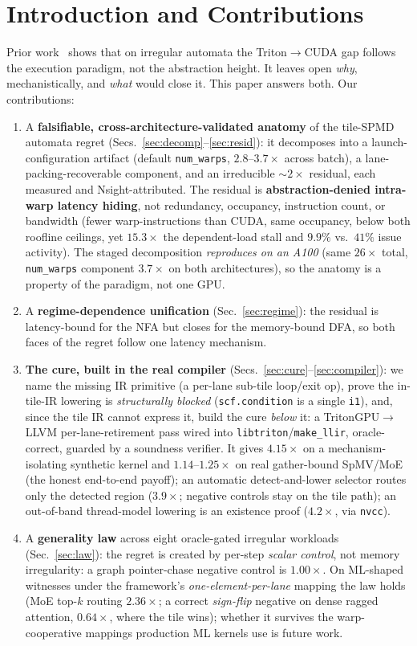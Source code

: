 \documentclass[manuscript,review,anonymous]{acmart}
\begin{document}
\section{Introduction and Contributions}
Prior work~\cite{paper1} shows that on irregular automata the Triton$\rightarrow$CUDA gap
follows the execution paradigm, not the abstraction height. It leaves open \emph{why}, mechanistically,
and \emph{what} would close it. This paper answers both. Our contributions:
\begin{enumerate}
\item A \textbf{falsifiable, cross-architecture-validated anatomy} of the tile-SPMD automata regret
(Secs.~\ref{sec:decomp}--\ref{sec:resid}): it decomposes into a launch-configuration artifact
(default \texttt{num\_warps}, $2.8$--$3.7\times$ across batch), a lane-packing-recoverable component,
and an irreducible ${\sim}2\times$ residual, each measured and Nsight-attributed. The residual is
\textbf{abstraction-denied intra-warp latency hiding}, not redundancy, occupancy, instruction count,
or bandwidth (fewer warp-instructions than CUDA, same occupancy, below both roofline ceilings, yet
$15.3\times$ the dependent-load stall and $9.9\%$ vs.\ $41\%$ issue activity). The staged decomposition
\emph{reproduces on an A100} (same $26\times$ total, \texttt{num\_warps} component $3.7\times$ on both
architectures), so the anatomy is a property of the paradigm, not one GPU.
\item A \textbf{regime-dependence unification} (Sec.~\ref{sec:regime}): the residual is latency-bound
for the NFA but closes for the memory-bound DFA, so both faces of the regret follow one latency mechanism.
\item \textbf{The cure, built in the real compiler} (Secs.~\ref{sec:cure}--\ref{sec:compiler}): we name
the missing IR primitive (a per-lane sub-tile loop/exit op), prove the in-tile-IR lowering is
\emph{structurally blocked} (\texttt{scf.condition} is a single \texttt{i1}), and, since the tile IR
cannot express it, build the cure \emph{below} it: a \mbox{TritonGPU$\rightarrow$LLVM} per-lane-retirement
pass wired into \texttt{libtriton}/\texttt{make\_llir}, oracle-correct, guarded by a soundness verifier.
It gives $4.15\times$ on a mechanism-isolating synthetic kernel and $1.14$--$1.25\times$ on real
gather-bound SpMV/MoE (the honest end-to-end payoff); an automatic detect-and-lower selector routes only
the detected region ($3.9\times$; negative controls stay on the tile path); an out-of-band thread-model
lowering is an existence proof ($4.2\times$, via \texttt{nvcc}).
\item A \textbf{generality law} across eight oracle-gated irregular workloads (Sec.~\ref{sec:law}):
the regret is created by per-step \emph{scalar control}, not memory irregularity: a graph pointer-chase
negative control is $1.00\times$. On ML-shaped witnesses under the framework's \emph{one-element-per-lane}
mapping the law holds (MoE top-$k$ routing $2.36\times$; a correct \emph{sign-flip} negative on dense
ragged attention, $0.64\times$, where the tile wins); whether it survives the warp-cooperative mappings
production ML kernels use is future work.
\end{enumerate}
\end{document}
